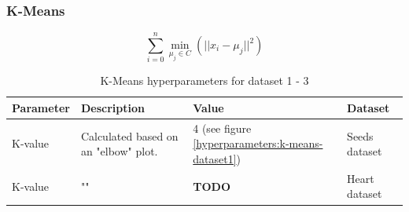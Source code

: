 \subsubsection{K-Means}
\begin{equation}
  \sum_{i=0}^{n}\min_{\mu_j \in C}(||x_i - \mu_j||^2)
\end{equation}
\begin{table}[h]
  \begin{tabular}{|l|p{6cm}|l|l|}
    \hline
    Parameter & Description                          & Value                                                 & Dataset       \\ \hline
    K-value   & Calculated based on an "elbow" plot. & 4 (see figure \ref{hyperparameters:k-means-dataset1}) & Seeds dataset \\ \hline
    K-value   & ""                                   & \textbf{TODO}                                         & Heart dataset \\ \hline
    \hline
  \end{tabular}
  \caption{K-Means hyperparameters for dataset 1 - 3}
  \label{tab:kmeans-formula-dataset-2}
\end{table}

